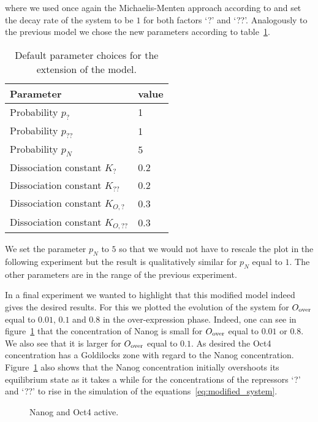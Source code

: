 where we used once again the Michaelis-Menten approach according to \cite{Olariu1} and set the decay rate of the system to be
$1$ for both factors `?' and `??'.
Analogously to the previous model we chose the new parameters according to table~\ref{tb:params_modified}.
\begin{table}
  \centering
   \begin{tabular}{l  l} 
   \hline
   Parameter & value \\ [0.5ex] 
   \hline\hline
   Probability $p_?$ & 1 \\
   Probability $p_{??}$ & 1 \\
   Probability $p_N$ & 5 \\
   Dissociation constant $K_?$ & 0.2 \\
   Dissociation constant $K_{??}$ & 0.2 \\
   Dissociation constant $K_{O,?}$ & 0.3 \\
   Dissociation constant $K_{O,??}$ & 0.3
   \end{tabular}
   \caption{Default parameter choices for the extension of the model.}
   \label{tb:params_modified}
\end{table}
We set the parameter $p_N$ to $5$ so that we would not have to rescale the plot in the following experiment but the result is 
qualitatively similar for $p_N$ equal to $1$. The other parameters
are in the range of the previous experiment.

In a final experiment we wanted to highlight that this modified model indeed gives the 
desired results.
For this we plotted the evolution of the system for $O_\text{over}$ equal to $0.01$, $0.1$ and $0.8$ in the
over-expression phase.
Indeed, one can see in figure~\ref{pl:repressed} that the concentration of Nanog is small for 
$O_\text{over}$ equal to $0.01$ or $0.8$. We also see that it is larger for $O_\text{over}$ equal to $0.1$.
As desired the Oct4 concentration has a Goldilocks zone with regard to the Nanog concentration.
Figure~\ref{pl:repressed} also shows that the Nanog concentration initially overshoots its
equilibrium state as it takes a while for the concentrations of the repressors `?' and `??' to rise
in the simulation of the equations~\eqref{eq:modified_system}.

\begin{figure}
\centering
\begin{minipage}[t]{0.3\textwidth}
\centering
\graphicspath{{../Plots/}}

\end{minipage}
\hfill
\centering
\begin{minipage}[t]{0.3\textwidth}
\centering
\graphicspath{{../Plots/}}

\end{minipage}
\hspace*{0.2cm}
\begin{minipage}[t]{0.3\textwidth}
\centering
\graphicspath{{../Plots/}}

\end{minipage}
\caption{Nanog and Oct4 active.}
\label{pl:repressed}
\end{figure}

